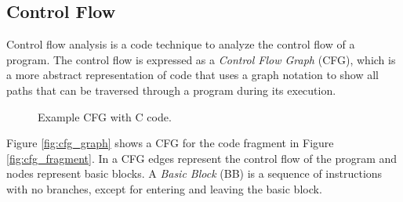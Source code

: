 \subsection{Control Flow}\label{sec:control_flow_graph}
Control flow analysis is a code technique to analyze the control flow of a program. The control flow is expressed as a \emph{Control Flow Graph} (CFG), which is a more abstract representation of code that uses a graph notation to show all paths that can be traversed through a program during its execution.  

\begin{figure}[H]
\centering
{}\quad\quad
{}
\hfill
\caption{Example CFG with C code.}
\label{fig:cfg}
\end{figure}

Figure \ref{fig:cfg_graph} shows a CFG for the code fragment in Figure \ref{fig:cfg_fragment}. In a CFG edges represent the control flow of the program and nodes represent basic blocks. A \emph{Basic Block} (BB) is a sequence of instructions with no branches, except for entering and leaving the basic block.




